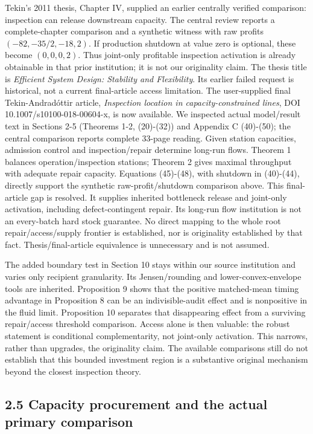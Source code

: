 \documentclass[
  11pt,
  a4paper,
]{article}
\begin{document}
Tekin's 2011 thesis, Chapter IV, supplied an earlier centrally verified
comparison: inspection can release downstream capacity. The central
review reports a complete-chapter comparison and a synthetic witness
with raw profits \((-82,-35/2,-18,2)\). If production shutdown at value
zero is optional, these become \((0,0,0,2)\). Thus joint-only profitable
inspection activation is already obtainable in that prior institution;
it is not our originality claim. The thesis title is \emph{Efficient
System Design: Stability and Flexibility}. Its earlier failed request is
historical, not a current final-article access limitation. The
user-supplied final Tekin-Andradóttir article, \emph{Inspection location
in capacity-constrained lines}, DOI 10.1007/s10100-018-00604-x, is now
available. We inspected actual model/result text in Sections 2-5
(Theorems 1-2, (20)-(32)) and Appendix C (40)-(50); the central
comparison reports complete 33-page reading. Given station capacities,
admission control and inspection/repair determine long-run flows.
Theorem 1 balances operation/inspection stations; Theorem 2 gives
maximal throughput with adequate repair capacity. Equations (45)-(48),
with shutdown in (40)-(44), directly support the synthetic
raw-profit/shutdown comparison above. This final-article gap is
resolved. It supplies inherited bottleneck release and joint-only
activation, including defect-contingent repair. Its long-run flow
institution is not an every-batch hard stock guarantee. No direct
mapping to the whole root repair/access/supply frontier is established,
nor is originality established by that fact. Thesis/final-article
equivalence is unnecessary and is not assumed.

The added boundary test in Section 10 stays within our source
institution and varies only recipient granularity. Its Jensen/rounding
and lower-convex-envelope tools are inherited. Proposition 9 shows that
the positive matched-mean timing advantage in Proposition 8 can be an
indivisible-audit effect and is nonpositive in the fluid limit.
Proposition 10 separates that disappearing effect from a surviving
repair/access threshold comparison. Access alone is then valuable: the
robust statement is conditional complementarity, not joint-only
activation. This narrows, rather than upgrades, the originality claim.
The available comparisons still do not establish that this bounded
investment region is a substantive original mechanism beyond the closest
inspection theory.

\hypertarget{capacity-procurement-and-the-actual-primary-comparison}{%
\subsection{2.5 Capacity procurement and the actual primary
comparison}\label{capacity-procurement-and-the-actual-primary-comparison}}
\end{document}
